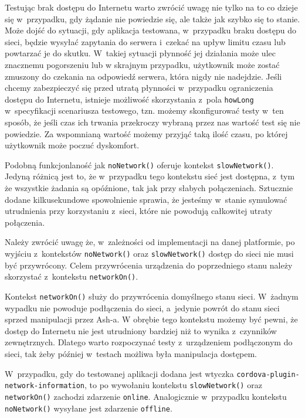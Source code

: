 \documentclass[brudnopis]{xmgr}
\begin{document}
Testując brak dostępu do Internetu warto zwrócić uwagę nie tylko na to co dzieje się w~przypadku, gdy żądanie nie powiedzie się, ale także jak szybko się to stanie. Może dojść do sytuacji, gdy aplikacja testowana, w~przypadku braku dostępu do sieci, będzie wysyłać zapytania do serwera i~czekać na upływ limitu czasu lub powtarzać je do skutku. W~takiej sytuacji płynność jej działania może ulec znacznemu pogorszeniu lub w skrajnym przypadku, użytkownik może zostać zmuszony do czekania na odpowiedź serwera, która nigdy nie nadejdzie. Jeśli chcemy zabezpieczyć się przed utratą płynności w~przypadku ograniczenia dostępu do Internetu, istnieje możliwość skorzystania z~pola \texttt{howLong} w~specyfikacji scenariusza testowego, tzn. możemy skonfigurować testy w~ten sposób, że jeśli czas ich trwania przekroczy wybraną przez nas wartość test się nie powiedzie. Za wspomnianą wartość możemy przyjąć taką ilość czasu, po której użytkownik może poczuć dyskomfort. 

Podobną funkcjonlaność jak \texttt{noNetwork()} oferuje kontekst \texttt{slowNetwork()}. Jedyną różnicą jest to, że w~przypadku tego kontekstu sieć jest dostępna, z~tym że wszystkie żadania są opóźnione, tak jak przy słabych połączeniach. Sztucznie dodane kilkusekundowe spowolnienie sprawia, że jesteśmy w~stanie symulować utrudnienia przy korzystaniu z~sieci, które nie powodują całkowitej utraty połączenia. 

Należy zwrócić uwagę że, w~zależności od implementacji na danej platformie, po wyjściu z~kontekstów \texttt{noNetwork()} oraz \texttt{slowNetwork()} dostęp do sieci nie musi być przywrócony. Celem przywrócenia urządzenia do poprzedniego stanu należy skorzystać z~kontekstu \texttt{networkOn()}. 

Kontekst \texttt{networkOn()} służy do przywrócenia domyślnego stanu sieci. W~żadnym wypadku nie powoduje podłączenia do sieci, a~jedynie powrót do stanu sieci sprzed manipulacji przez Ash-a. W obrębie tego kontekstu możemy być pewni, że dostęp do Internetu nie jest utrudniony bardziej niż to wynika z~czynników zewnętrznych. Dlatego warto rozpoczynać testy z~urządzeniem podłączonym do sieci, tak żeby później w~testach możliwa była manipulacja dostępem.

W~przypadku, gdy do testowanej aplikacji dodana jest wtyczka \texttt{cordova\--plugin-network-information},  to po wywołaniu kontekstu \texttt{slowNetwork()} oraz \texttt{networkOn()} zachodzi zdarzenie \texttt{online}. Analogicznie w~przypadku kontekstu \texttt{noNetwork()} wysyłane jest zdarzenie \texttt{offline}. 
\end{document}
